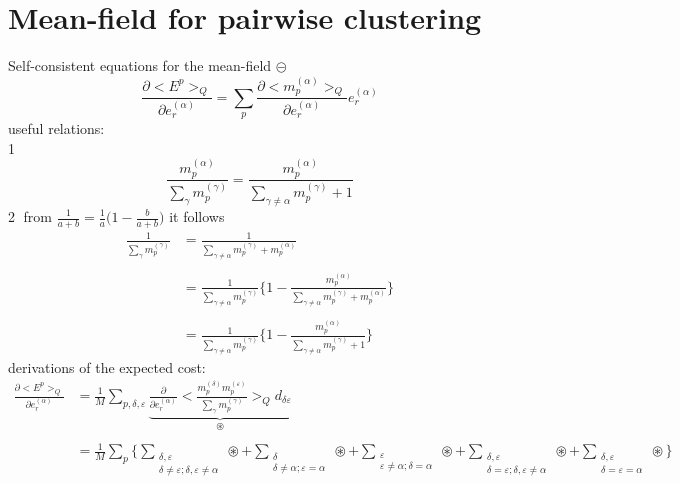 \documentclass[a4paper,11pt]{article}
\begin{document}
\section{Mean-field for pairwise clustering}
Self-consistent equations for the mean-field $\circleddash$
\begin{equation}
	\frac{\partial \big<E^p\big>_Q}{\partial e_r^{(\alpha)}}
	=\sum\limits_p \frac{\partial \Big<m_p^{(\alpha)}\Big>_Q}{
		\partial e_r^{(\alpha)}} e_r^{(\alpha)}
\end{equation}
useful relations:\\
\textcircled{1}
\begin{equation}
	\frac{m_p^{(\alpha)}}{\sum\limits_\gamma m_p^{(\gamma)}} 
	= \frac{m_p^{(\alpha)}}{\sum\limits_{\gamma \neq \alpha} m_p^{(\gamma)}
		+ 1}
\end{equation}
\textcircled{2} from $\frac{1}{a+b} = \frac{1}{a} \Big(1 - \frac{b}{a+b} \Big)$ it follows
\begin{equation}
	\begin{array}{ll}
	\frac{1}{\sum\limits_\gamma m_p^{(\gamma)}} 
	& = \frac{1}{\sum\limits_{\gamma \neq \alpha} m_p^{(\gamma)} 
		+ m_p^{(\alpha)}} \\\\
	& = \frac{1}{\sum\limits_{\gamma \neq \alpha} m_p^{(\gamma)}}
		\Bigg\{ 1 - \frac{m_p^{(\alpha)}}{\sum\limits_{\gamma
			\neq \alpha} m_p^{(\gamma)} + m_p^{(\alpha)}}
		\Bigg\} \\\\
	& = \frac{1}{\sum\limits_{\gamma \neq \alpha} m_p^{(\gamma)}}
		\Bigg\{	1 - \frac{m_p^{(\alpha)}}{\sum\limits_{\gamma \neq
			\alpha} m_p^{(\gamma)} + 1}
		\Bigg\}
	\end{array}
\end{equation}
derivations of the expected cost:
\begin{equation}
	\begin{array}{ll}
	\frac{\partial \big< E^p \big>_Q}{\partial e_r^{(\alpha)}}
	& = \frac{1}{M} \sum\limits_{p,\delta,\varepsilon} 
		\underbrace{\frac{\partial}{
		\partial e_r^{(\alpha)}} \Bigg< \frac{m_p^{(\delta)} 
			m_p^{(\varepsilon)}}{\sum\limits_\gamma
				m_p^{(\gamma)}}
		\Bigg>_Q d_{\delta \varepsilon}}_{\circledast} \\\\
	& = \frac{1}{M} \sum_p \Bigg\{ 
		\sum\limits_{\substack{\delta, \varepsilon \\ \delta \neq 
			\varepsilon; \delta, \varepsilon \neq \alpha}} 
			\circledast
			+ \sum\limits_{\substack{\delta \\ \delta \neq \alpha;
				\varepsilon = \alpha}} \circledast
			+ \sum\limits_{\substack{\varepsilon \\ \varepsilon
				\neq \alpha; \delta = \alpha}} \circledast
			+ \sum\limits_{\substack{\delta, \varepsilon \\
				\delta = \varepsilon; \delta, \varepsilon
				\neq \alpha}} \circledast
			+ \sum\limits_{\substack{\delta, \varepsilon \\
				\delta = \varepsilon = \alpha}} \circledast
		\Bigg\}
	\end{array}
\end{equation}
\end{document}
